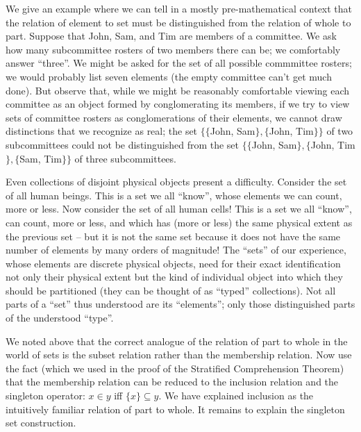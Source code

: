 We give an example where we can tell in a mostly pre-mathematical
context that the relation of element to set must be
distinguished from the relation of whole to part.  Suppose that John, Sam, and Tim are 
members of a committee.  We ask how many subcommittee rosters of two
members there can be; we comfortably answer ``three''.  We might be
asked for the set of all possible commmittee rosters; we would
probably list seven elements (the empty committee can't get
much done).  But observe that, while we might be reasonably comfortable
viewing each committee as an object formed by conglomerating its
members, if we try to view sets of committee rosters as
conglomerations of their elements, we cannot draw distinctions that we
recognize as real; the set $\{\{$John, Sam$\},\{$John, Tim$\}\}$ of
two subcommittees could not be distinguished from the set $\{\{$John,
Sam$\},\{$John, Tim$\},\{$Sam, Tim$\}\}$ of three subcommittees.

Even collections of disjoint physical objects present a
difficulty. 
Consider the set of all human beings.  This is a set we all ``know'',
whose elements we can count, more or less.  Now consider the set of
all human cells!  This is a set we all ``know'', can count, more or
less, and which has (more or less) the same physical extent as the
previous set -- but it is not the same set because it does not have
the same number of elements by many orders of magnitude!  The ``sets''
of our experience, whose elements are discrete physical objects, need
for their exact identification not only their physical extent but the
kind of individual object into which they should be partitioned (they
can be thought of as ``typed'' collections).  Not all parts of a ``set'' thus understood are its ``elements''; only those
distinguished parts of the understood ``type''.

We noted above that the correct analogue of the relation of part to
whole in the world of sets is the subset relation rather than the
membership relation.  Now use the fact (which we used in the
proof of the Stratified Comprehension Theorem) that the membership relation can be reduced to the
inclusion relation and the singleton
operator: $x \in y$ iff $\{x\} \subseteq y$.  We have explained inclusion as
the intuitively familiar relation of part to whole.  It remains to explain the singleton set construction.

